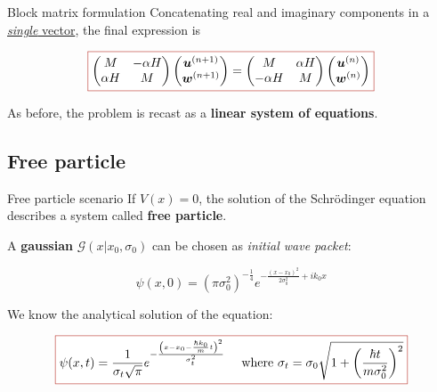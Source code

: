 \begin{frame}{Block matrix formulation}
    Concatenating real and imaginary components in a \underline{\textit{single} vector}, the final expression is

    \begin{equation*}
        \fcolorbox{BrickRed}{white}{\text{$\displaystyle\begin{pmatrix}
            M & -\alpha H\\
            \alpha H & M
        \end{pmatrix}
        \begin{pmatrix}
            \boldsymbol{u}^{(n+1)}\\
            \boldsymbol{w}^{(n+1)}
        \end{pmatrix}
        =
        \begin{pmatrix}
            M & \alpha H\\
            -\alpha H & M
        \end{pmatrix}
        \begin{pmatrix}
            \boldsymbol{u}^{(n)}\\
            \boldsymbol{w}^{(n)}
        \end{pmatrix}$}}
    \end{equation*}

    \vfill

    \normalsize

    \begin{center}
        As before, the problem is recast as a \textbf{linear system of equations}.
   \end{center}

    \vfill
\end{frame}

\subsection{Free particle}

\begin{frame}{Free particle scenario}
    If $V(x)=0$, the solution of the Schrödinger equation describes a system called \textcolor{BrickRed}{\textbf{free particle}}.

    \pause

    \vfill

    A \textbf{gaussian} $\mathcal{G}\left(x|x_0,\sigma_0\right)$ can be chosen as \textit{initial wave packet}:

    \begin{equation*}
        \psi(x,0)=\left(\pi\sigma_0^2\right)^{-\frac{1}{4}}e^{-\frac{\left(x-x_0\right)^2}{2\sigma_0^2}+ik_0x}
    \end{equation*}

    We know the analytical solution of the equation:

    \begin{equation*}
        \fcolorbox{BrickRed}{white}{\text{$\displaystyle\psi(x,t)=\frac{1}{\sigma_t\sqrt{\pi}}e^{-\frac{\left(x-x_0-\frac{\hbar k_0}{m}t\right)^2}{\sigma_t^2}} \ \ \ \ \text{where} \ \sigma_t=\sigma_0\sqrt{1+\left(\frac{\hbar t}{m\sigma_0^2}\right)^2}$}}
    \end{equation*}
\end{frame}

